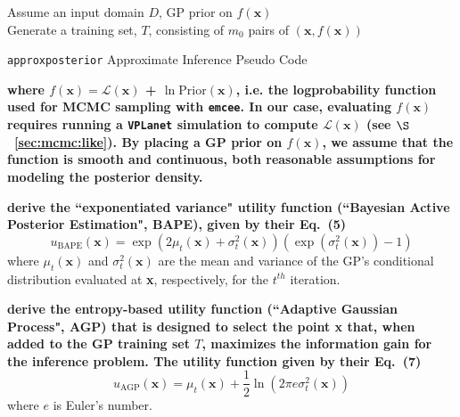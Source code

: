 \documentclass[twocolumn]{aastex62}
\newcommand{\xxx}[1]{{\textbf{#1}}}
\newcommand{\vplanet}[0]{\texttt{VPLanet}\xspace}
\newcommand{\emcee}[0]{\texttt{emcee}\xspace}
\newcommand{\approxposterior}[0]{\texttt{approxposterior}\xspace}
\begin{document}
\begin{algorithm}[H] \label{app:algo}
\SetAlgoLined
 Assume an input domain $D$, GP prior on $f(\textbf{x})$ \\
 Generate a training set, $T$, consisting of $m_0$ pairs of $(\textbf{x}, f(\textbf{x}))$ \\
\caption{\approxposterior Approximate Inference Pseudo Code}
\end{algorithm}
\xxx{where $f(\textbf{x}) = \mathcal{L}(\textbf{x})$ + $\ln \mathrm{Prior}(\textbf{x})$, i.e. the logprobability function used for MCMC sampling with \emcee. In our case, evaluating $f(\textbf{x})$ requires running a \vplanet simulation to compute $\mathcal{L}(\textbf{x})$ (see $\S$~\ref{sec:mcmc:like}). By placing a GP prior on $f(\textbf{x})$, we assume that the function is smooth and continuous, both reasonable assumptions for modeling the posterior density.}

\xxx{\citet{Kandasamy2017} derive the ``exponentiated variance" utility function (``Bayesian Active Posterior Estimation", BAPE), given by their Eq.~(5)}
\begin{equation} \label{app:eq:bape}
    u_{\textrm{BAPE}}(\textbf{x}) = \exp(2 \mu_t(\textbf{x}) + \sigma_t^2(\textbf{x}))(\exp(\sigma_t^2(\textbf{x})) - 1)
\end{equation}
where $\mu_t(\textbf{x})$ and $\sigma_t^2(\textbf{x})$ are the mean and variance of the GP's conditional distribution evaluated at \textbf{x}, respectively, for the $t^{th}$ iteration.

\xxx{\citet{Wang2018} derive the entropy-based utility function (``Adaptive Gaussian Process", AGP) that is designed to select the point \textbf{x} that, when added to the GP training set $T$, maximizes the information gain for the inference problem. The \citet{Wang2018} utility function given by their Eq.~(7)}
\begin{equation} \label{app:eq:agp}
    u_{\textrm{AGP}}(\textbf{x}) = \mu_t(\textbf{x}) + \frac{1}{2}\ln{(2\pi e \sigma_t^2(\textbf{x}))}
\end{equation}
where $e$ is Euler's number.
\end{document}
